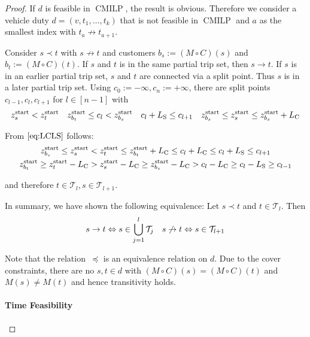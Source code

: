 \begin{proof}

If $d$ is feasible in $\operatorname{CMILP}$, the result is obvious. Therefore we consider a vehicle duty ${d=\left(v,t_1,\dots,t_k\right)}$ that is not feasible in $\operatorname{CMILP}$ and $a$ as the smallest index with ${t_a\not\to t_{a+1}}$.

Consider ${s\prec t}$ with ${s\not\to t}$ and customers ${b_s:=\left(M\circ C\right)(s)}$ and ${b_t:=\left(M\circ C\right)(t)}$. If $s$ and $t$ is in the same partial trip set, then ${s\to t}$. If $s$ is in an earlier partial trip set, $s$ and $t$ are connected via a split point. Thus $s$ is in a later partial trip set. Using ${c_{0}:=-\infty}, {c_n:=+\infty}$, there are split points $c_{l-1},c_l,c_{l+1}$ for $l\in[n-1]$ with
\begin{align*}
	z^{\operatorname{start}}_s < z^{\operatorname{start}}_t && z^{\operatorname{start}}_{b_t}\leq c_l <z^{\operatorname{start}}_{b_s} && c_l+L_{\operatorname{S}}\leq c_{l+1} && z^{\operatorname{start}}_{b_s}\leq z^{\operatorname{start}}_s\leq z^{\operatorname{start}}_{b_s}+L_{\operatorname{C}}
\end{align*}

From $\eqref{eq:LCLS}$ follows:
\begin{gather*}
	z^{\operatorname{start}}_{b_s} \leq z^{\operatorname{start}}_s < z^{\operatorname{start}}_t\leq z^{\operatorname{start}}_{b_t}+L_{\operatorname{C}} \leq c_l+L_{\operatorname{C}} \leq c_l+L_{\operatorname{S}} \leq c_{l+1} \\
	z^{\operatorname{start}}_{b_t} \geq z^{\operatorname{start}}_t-L_{\operatorname{C}} > z^{\operatorname{start}}_s-L_{\operatorname{C}} \geq z^{\operatorname{start}}_{b_s}-L_{\operatorname{C}} > c_l-L_{\operatorname{C}}\geq c_l-L_{\operatorname{S}}\geq c_{l-1}
\end{gather*}

and therefore $t\in\mathcal{T}_l,s\in\mathcal{T}_{l+1}$.

In summary, we have shown the following equivalence: Let ${s\prec t}$ and ${t\in\mathcal{T}_l}$. Then
\begin{align*}
	s\to t \Leftrightarrow s\in\bigcup_{j=1}^l \mathcal{T}_j && s\not\to t \Leftrightarrow s\in\mathcal{T}_{l+1}
\end{align*}

Note that the relation~$\preceq$ is an equivalence relation on $d$. Due to the cover constraints, there are no ${s,t\in d}$ with ${\left(M\circ C\right)(s)=\left(M\circ C\right)(t)}$ and ${M(s)\neq M(t)}$ and hence transitivity holds.

\paragraph{Time Feasibility} \proofparfill


\end{proof}
